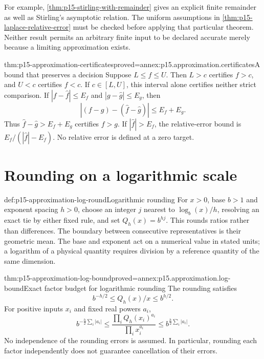 For example, \cref{thm:p15-stirling-with-remainder} gives an explicit finite
remainder as well as Stirling's asymptotic relation. The uniform assumptions
in \cref{thm:p15-laplace-relative-error} must be checked before applying
that particular theorem. Neither result permits an arbitrary finite input to be
declared accurate merely because a limiting approximation exists.

\begin{hbtheorem}{thm:p15-approximation-certificates}{proved=annex:p15.approximation.certificates}{A bound that preserves a decision}
Suppose \(L\leq f\leq U\). Then \(L>c\) certifies \(f>c\), and \(U<c\)
certifies \(f<c\). If \(c\in[L,U]\), this interval alone certifies neither
strict comparison. If \(|f-\widehat f|\leq E_f\) and
\(|g-\widehat g|\leq E_g\), then
\[
 |(f-g)-(\widehat f-\widehat g)|\leq E_f+E_g.
\]
Thus \(\widehat f-\widehat g>E_f+E_g\) certifies \(f>g\).
If \(|\widehat f|>E_f\), the relative-error bound is
\(E_f/(|\widehat f|-E_f)\). No relative error is defined at a zero target.
\end{hbtheorem}

\section{Rounding on a logarithmic scale}

\begin{hbdefinition}{def:p15-approximation-log-round}{Logarithmic rounding}
For \(x>0\), base \(b>1\) and exponent spacing \(h>0\), choose an integer
\(j\) nearest to \(\log_b(x)/h\), resolving an exact tie by either fixed rule,
and set \(Q_h(x)=b^{hj}\). This rounds ratios rather than differences.
The boundary between consecutive representatives is their geometric mean.
The base and exponent act on a numerical value in stated units; a logarithm
of a physical quantity requires division by a reference quantity of the same
dimension.
\end{hbdefinition}

\begin{hbtheorem}{thm:p15-approximation-log-bound}{proved=annex:p15.approximation.log-bound}{Exact factor budget for logarithmic rounding}
The rounding satisfies
\[
 b^{-h/2}\leq Q_h(x)/x\leq b^{h/2}.
\]
For positive inputs \(x_i\) and fixed real powers \(a_i\),
\[
 b^{-\frac h2\sum_i|a_i|}
 \leq\frac{\prod_i Q_h(x_i)^{a_i}}{\prod_i x_i^{a_i}}
 \leq b^{\frac h2\sum_i|a_i|}.
\]
No independence of the rounding errors is assumed. In particular, rounding
each factor independently does not guarantee cancellation of their errors.
\end{hbtheorem}

